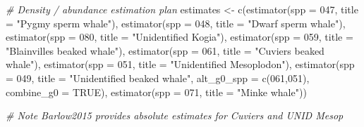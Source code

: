 \documentclass[
]{book}
\newenvironment{Shaded}{\begin{snugshade}}{\end{snugshade}}
\newcommand{\AttributeTok}[1]{\textcolor[rgb]{0.77,0.63,0.00}{#1}}
\newcommand{\CommentTok}[1]{\textcolor[rgb]{0.56,0.35,0.01}{\textit{#1}}}
\newcommand{\ConstantTok}[1]{\textcolor[rgb]{0.00,0.00,0.00}{#1}}
\newcommand{\FunctionTok}[1]{\textcolor[rgb]{0.00,0.00,0.00}{#1}}
\newcommand{\NormalTok}[1]{#1}
\newcommand{\OtherTok}[1]{\textcolor[rgb]{0.56,0.35,0.01}{#1}}
\newcommand{\StringTok}[1]{\textcolor[rgb]{0.31,0.60,0.02}{#1}}
\begin{document}
\begin{Shaded}
\begin{Highlighting}[]
  \CommentTok{\# Density / abundance estimation plan}
\NormalTok{  estimates }\OtherTok{\textless{}{-}}
      \FunctionTok{c}\NormalTok{(}\FunctionTok{estimator}\NormalTok{(}\AttributeTok{spp =} \StringTok{\textquotesingle{}047\textquotesingle{}}\NormalTok{, }\AttributeTok{title =} \StringTok{"Pygmy sperm whale"}\NormalTok{),}
        \FunctionTok{estimator}\NormalTok{(}\AttributeTok{spp =} \StringTok{\textquotesingle{}048\textquotesingle{}}\NormalTok{, }\AttributeTok{title =} \StringTok{"Dwarf sperm whale"}\NormalTok{),}
        \FunctionTok{estimator}\NormalTok{(}\AttributeTok{spp =} \StringTok{\textquotesingle{}080\textquotesingle{}}\NormalTok{, }\AttributeTok{title =} \StringTok{"Unidentified Kogia"}\NormalTok{),}
        \FunctionTok{estimator}\NormalTok{(}\AttributeTok{spp =} \StringTok{\textquotesingle{}059\textquotesingle{}}\NormalTok{, }\AttributeTok{title =} \StringTok{"Blainville\textquotesingle{}s beaked whale"}\NormalTok{),}
        \FunctionTok{estimator}\NormalTok{(}\AttributeTok{spp =} \StringTok{\textquotesingle{}061\textquotesingle{}}\NormalTok{, }\AttributeTok{title =} \StringTok{"Cuvier\textquotesingle{}s beaked whale"}\NormalTok{),}
        \FunctionTok{estimator}\NormalTok{(}\AttributeTok{spp =} \StringTok{\textquotesingle{}051\textquotesingle{}}\NormalTok{, }\AttributeTok{title =} \StringTok{"Unidentified Mesoplodon"}\NormalTok{),}
        \FunctionTok{estimator}\NormalTok{(}\AttributeTok{spp =} \StringTok{\textquotesingle{}049\textquotesingle{}}\NormalTok{, }
                  \AttributeTok{title =} \StringTok{"Unidentified beaked whale"}\NormalTok{,}
                  \AttributeTok{alt\_g0\_spp =} \FunctionTok{c}\NormalTok{(}\StringTok{\textquotesingle{}061\textquotesingle{}}\NormalTok{,}\StringTok{\textquotesingle{}051\textquotesingle{}}\NormalTok{),}
                  \AttributeTok{combine\_g0 =} \ConstantTok{TRUE}\NormalTok{),}
        \FunctionTok{estimator}\NormalTok{(}\AttributeTok{spp =} \StringTok{\textquotesingle{}071\textquotesingle{}}\NormalTok{, }\AttributeTok{title =} \StringTok{"Minke whale"}\NormalTok{))}

  \CommentTok{\# Note Barlow2015 provides absolute estimates for Cuviers and UNID Mesop}
  

\end{Highlighting}
\end{Shaded}
\end{document}

